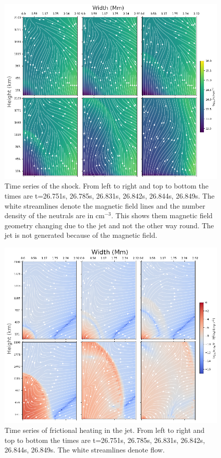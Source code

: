 \documentclass[12pt,upcase]{umlthesis}
\begin{document}
\begin{figure}[ht!]
	\centering
    \includegraphics[width=1\textwidth]{images/spiculetimeseries.eps}
    \caption{Time series of the shock. From left to right and top to bottom the times are t=26.751s, 26.785s, 26.831s, 26.842s, 26.844s, 26.849s. The white streamlines denote the magnetic field lines and the number density of the neutrals are in cm$^{-3}$. This shows them magnetic field geometry changing due to the jet and not the other way round. The jet is not generated because of the magnetic field.}\label{fig:spiculetimeseries}
\end{figure}

\begin{figure}[ht!]
	\centering
    \includegraphics[width=1\textwidth]{images/heatingtimeseries.eps}
    \caption{Time series of frictional heating in the jet. From left to right and top to bottom the times are t=26.751s, 26.785s, 26.831s, 26.842s, 26.844s, 26.849s. The white streamlines denote flow.}\label{fig:heatingtimeseries}
\end{figure}
\end{document}
